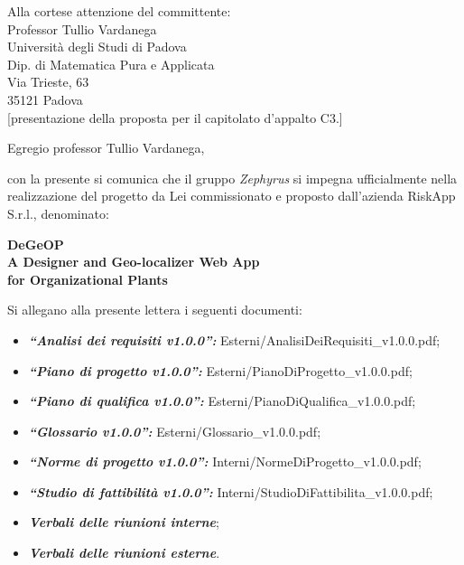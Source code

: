 \documentclass[a4paper,12pt]{letteracdp}
\author{Giulia Petenazzi}
\date{9 gennaio 2017}
\begin{document}
	\begin{letter}{
			Alla cortese attenzione del committente: \\
			Professor Tullio Vardanega \\
			Università degli Studi di Padova \\
			Dip. di Matematica Pura e Applicata\\
			Via Trieste, 63 \\
			35121 Padova\\}[presentazione della proposta per il capitolato d'appalto C3.]

	\opening{Egregio professor Tullio Vardanega,}
	con la presente si comunica che il gruppo \textit{Zephyrus} si impegna ufficialmente nella realizzazione del progetto da Lei commissionato e proposto dall'azienda RiskApp S.r.l., denominato:

	\vspace{0.6cm}
	\begin{center}
        \textbf{DeGeOP \\ A Designer and Geo-localizer Web App \\for Organizational Plants}\\
	\end{center}
	\vspace{0.6cm}

	\noindent Si allegano alla presente lettera i seguenti documenti:

	\begin{itemize}
        \item \textit{\textbf{“Analisi dei requisiti v1.0.0”:}} Esterni/AnalisiDeiRequisiti\_v1.0.0.pdf;
		\item \textit{\textbf{“Piano di progetto v1.0.0”:}} Esterni/PianoDiProgetto\_v1.0.0.pdf;
		\item \textit{\textbf{“Piano di qualifica v1.0.0”:}} Esterni/PianoDiQualifica\_v1.0.0.pdf;
		\item \textit{\textbf{“Glossario v1.0.0”:}} Esterni/Glossario\_v1.0.0.pdf;
		\item \textit{\textbf{“Norme di progetto v1.0.0”:}} Interni/NormeDiProgetto\_v1.0.0.pdf;
		\item \textit{\textbf{“Studio di fattibilità v1.0.0”:}} Interni/StudioDiFattibilita\_v1.0.0.pdf;
		\item \textit{\textbf{Verbali delle riunioni interne}};
		\item \textit{\textbf{Verbali delle riunioni esterne}}.
	\end{itemize}


\end{letter}
\end{document}
